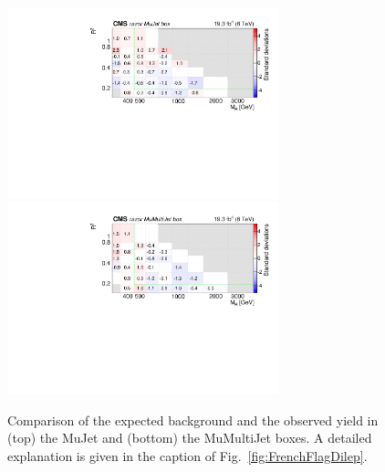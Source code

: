 \begin{figure}[tb!]
\centering
\includegraphics[width=0.7\textwidth]{figs/analysis8TeV/nSigmaLog_MuJet.pdf}
\includegraphics[width=0.7\textwidth]{figs/analysis8TeV/nSigmaLog_MuMultiJet.pdf}
\caption{Comparison of the expected background and the observed yield
  in (top) the MuJet and (bottom) the MuMultiJet boxes. A detailed explanation is given in the caption of
  Fig.~\ref{fig:FrenchFlagDilep}.\label{fig:FrenchFlagMu}}
\end{figure}

